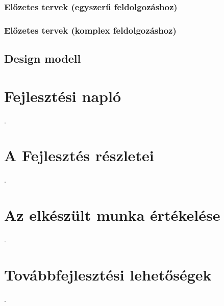 \documentclass[a4paper,12pt,oneside]{report}
\begin{document}
\subsubsection{Előzetes tervek (egyszerű feldolgozáshoz)}
\subsubsection{Előzetes tervek (komplex feldolgozáshoz)}


\subsection{Design modell}


\section{Fejlesztési napló}
.
\section{A Fejlesztés részletei}
.
\section{Az elkészült munka értékelése}
.
\section{Továbbfejlesztési lehetőségek}
.
%
%
\end{document}
